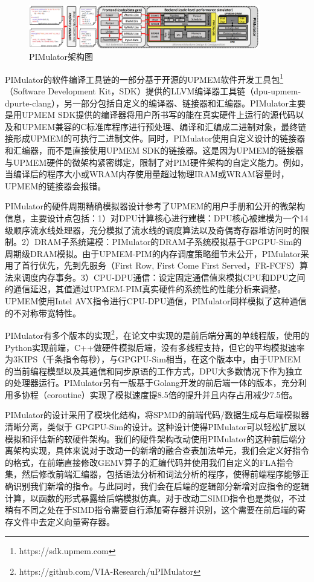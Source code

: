 \begin{figure}[!htbp]
	\centering
    \includegraphics[width=0.9\textwidth]{figures/PIMulator.png}
	\caption{PIMulator架构图}
    \label{PIMulator}
\end{figure}

PIMulator的软件编译工具链的一部分基于开源的UPMEM软件开发工具包\footnote{https://sdk.upmem.com}（Software Development Kit，SDK）提供的LLVM\cite{LLVM}编译器工具链（dpu-upmem-dpurte-clang），另一部分包括自定义的编译器、链接器和汇编器。PIMulator主要是用UPMEM SDK提供的编译器将用户所书写的能在真实硬件上运行的源代码以及和UPMEM兼容的C标准库程序进行预处理、编译和汇编成二进制对象，最终链接形成UPMEM的可执行二进制文件。同时，PIMulator使用自定义设计的链接器和汇编器，而不是直接使用UPMEM SDK的链接器。这是因为UPMEM的链接器与UPMEM硬件的微架构紧密绑定，限制了对PIM硬件架构的自定义能力。例如，当编译后的程序大小或WRAM内存使用量超过物理IRAM或WRAM容量时，UPMEM的链接器会报错。

PIMulator的硬件周期精确模拟器设计参考了UPMEM的用户手册和公开的微架构信息，主要设计点包括：1）对DPU计算核心进行建模：DPU核心被建模为一个14级顺序流水线处理器，充分模拟了流水线的调度算法以及奇偶寄存器堆访问时的限制。2）DRAM子系统建模：PIMulator的DRAM子系统模拟基于GPGPU-Sim的周期级DRAM模拟\cite{GPGPU-Sim}。由于UPMEM-PIM的内存调度策略细节未公开，PIMulator采用了首行优先，先到先服务（First Row, First Come First Served，FR-FCFS）算法来调度内存事务。3）CPU-DPU通信：设定固定通信值来模拟CPU和DPU之间的通信延迟，其值通过UPMEM-PIM真实硬件的系统性的性能分析来调整。UPMEM使用Intel AVX指令进行CPU-DPU通信，PIMulator同样模拟了这种通信的不对称带宽特性。

PIMulator有多个版本的实现\footnote{https://github.com/VIA-Research/uPIMulator}，在论文中实现的是前后端分离的单线程版，使用的Python实现前端，C++做硬件模拟后端，没有多线程支持，但它的平均模拟速率为3KIPS（千条指令每秒），与GPGPU-Sim相当，在这个版本中，由于UPMEM的当前编程模型以及其通信和同步原语的工作方式，DPU大多数情况下作为独立的处理器运行。PIMulator另有一版基于Golang开发的前后端一体的版本，充分利用多协程（coroutine）实现了模拟速度提8.5倍的提升并且内存占用减少7.5倍。

PIMulator的设计采用了模块化结构，将SPMD的前端代码/数据生成与后端模拟器清晰分离，类似于 GPGPU-Sim的设计。这种设计使得PIMulator可以轻松扩展以模拟和评估新的软硬件架构。我们的硬件架构改动使用PIMulator的这种前后端分离架构实现，具体来说对于改动一的新增的融合查表加法单元，我们会定义好指令的格式，在前端直接修改GEMV算子的汇编代码并使用我们自定义的FLA指令集，然后修改前端汇编器，包括语法分析和词法分析的程序，使得前端程序能够正确识别我们新增的指令。与此同时，我们会在后端的逻辑部分新增对应指令的逻辑计算，以函数的形式暴露给后端模拟仿真。对于改动二SIMD指令也是类似，不过稍有不同之处在于SIMD指令需要自行添加寄存器并识别，这个需要在前后端的寄存文件中去定义向量寄存器。

